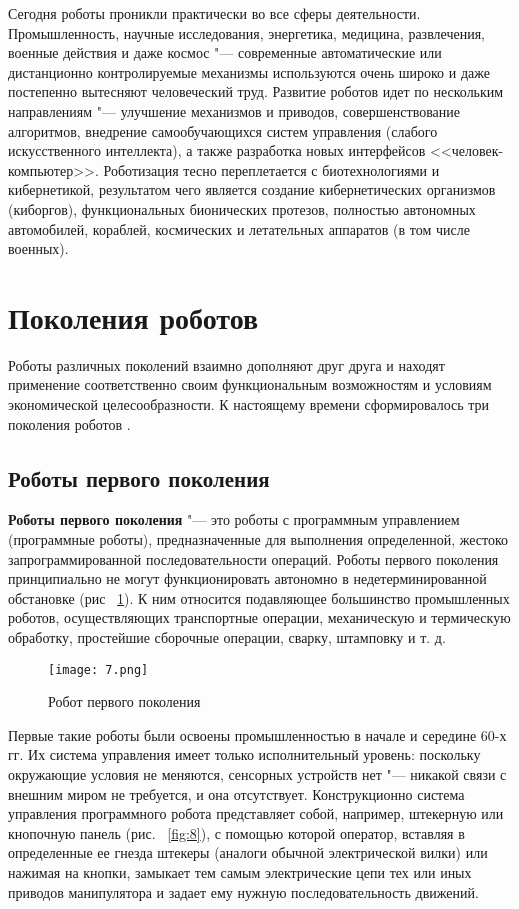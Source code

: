 \documentclass[bachelor, och, referat]{SCWorks}
\begin{document}
Сегодня роботы проникли практически во все сферы деятельности. Промышленность,
научные исследования, энергетика, медицина, развлечения, военные действия и даже
космос "--- современные автоматические или дистанционно контролируемые механизмы
используются очень широко и даже постепенно вытесняют человеческий труд.
Развитие роботов идет по нескольким направлениям "--- улучшение механизмов и
приводов, совершенствование алгоритмов, внедрение самообучающихся систем
управления (слабого искусственного интеллекта), а также разработка новых
интерфейсов <<человек-компьютер>>. Роботизация тесно переплетается с
биотехнологиями и кибернетикой, результатом чего является создание
кибернетических организмов (киборгов), функциональных бионических протезов,
полностью автономных автомобилей, кораблей, космических и летательных аппаратов
(в том числе военных). 

\section{Поколения роботов}

Роботы различных поколений взаимно дополняют друг друга и находят применение
соответственно своим функциональным возможностям и условиям экономической
целесообразности. К настоящему времени сформировалось три поколения роботов \cite{4}.

\subsection{Роботы первого поколения}

\textbf{Роботы первого поколения} "--- это роботы с программным управлением
(программные роботы), предназначенные для выполнения определенной, жестоко
запрограммированной последовательности операций. Роботы первого поколения
принципиально не могут функционировать автономно в недетерминированной
обстановке (рис ~\ref{fig:7}). К ним относится подавляющее большинство промышленных роботов,
осуществляющих транспортные операции, механическую и термическую обработку,
простейшие сборочные операции, сварку, штамповку и т. д.

\begin{figure}[h!]
    \centering
    \texttt{[image: 7.png]}
    \caption{\label{fig:7}%
    Робот первого поколения}
\end{figure}

Первые такие роботы были освоены промышленностью в начале и середине 60-х гг. Их
система управления имеет только исполнительный уровень: поскольку окружающие
условия не меняются, сенсорных устройств нет "--- никакой связи с внешним миром
не требуется, и она отсутствует. Конструкционно система управления программного
робота представляет собой, например, штекерную или кнопочную панель (рис.
~\ref{fig:8}), с помощью которой оператор, вставляя в определенные ее гнезда
штекеры (аналоги обычной электрической вилки) или нажимая на кнопки, замыкает
тем самым электрические цепи тех или иных приводов манипулятора и задает ему
нужную последовательность движений.
\end{document}
